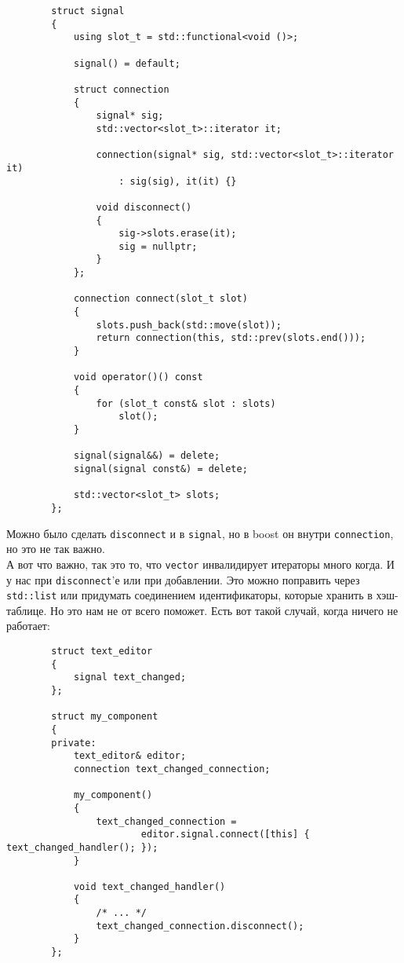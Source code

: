 \documentclass{article}
\begin{document}
    \begin{verbatim}
        struct signal
        {
            using slot_t = std::functional<void ()>;

            signal() = default;

            struct connection
            {
                signal* sig;
                std::vector<slot_t>::iterator it;
                
                connection(signal* sig, std::vector<slot_t>::iterator it)
                    : sig(sig), it(it) {}

                void disconnect()
                {
                    sig->slots.erase(it);
                    sig = nullptr;
                }
            };

            connection connect(slot_t slot)
            {
                slots.push_back(std::move(slot));
                return connection(this, std::prev(slots.end()));
            }

            void operator()() const
            {
                for (slot_t const& slot : slots)
                    slot();
            }

            signal(signal&&) = delete;
            signal(signal const&) = delete;

            std::vector<slot_t> slots;
        };
    \end{verbatim}
    Можно было сделать \texttt{disconnect} и в \texttt{signal}, но в boost он внутри \texttt{connection}, но это не так важно.\\
    А вот что важно, так это то, что \texttt{vector} инвалидирует итераторы много когда. И у нас при \texttt{disconnect}'е или при добавлении. Это можно поправить через \texttt{std::list} или придумать соединением идентификаторы, которые хранить в хэш-таблице. Но это нам не от всего поможет. Есть вот такой случай, когда ничего не работает:
    \begin{verbatim}
        struct text_editor
        {
            signal text_changed;
        };

        struct my_component
        {
        private:
            text_editor& editor;
            connection text_changed_connection;

            my_component()
            {
                text_changed_connection =
                        editor.signal.connect([this] { text_changed_handler(); });
            }

            void text_changed_handler()
            {
                /* ... */
                text_changed_connection.disconnect();
            }
        };
    \end{verbatim}
\end{document}
